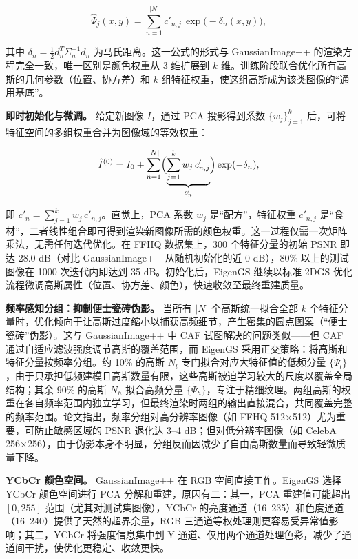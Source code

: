 \begin{equation}
\hat{\Psi}_j(x, y) = \sum_{n=1}^{|N|} c'_{n,j} \, \exp\!\bigl(-\delta_n(x, y)\bigr),
\end{equation}

其中 $\delta_n = \tfrac{1}{2} d_n^T \Sigma_n^{-1} d_n$ 为马氏距离。这一公式的形式与 GaussianImage++ 的渲染方程完全一致，唯一区别是颜色权重从 3 维扩展到 $k$ 维。训练阶段联合优化所有高斯的几何参数（位置、协方差）和 $k$ 组特征权重，使这组高斯成为该类图像的``通用基底''。

\textbf{即时初始化与微调。} 给定新图像 $I$，通过 PCA 投影得到系数 $\{w_j\}_{j=1}^k$ 后，可将特征空间的多组权重合并为图像域的等效权重：

\begin{equation}
\hat{I}^{(0)} = I_0 + \sum_{n=1}^{|N|} \Bigl(\underbrace{\sum_{j=1}^k w_j \, c'_{n,j}}_{c'_n}\Bigr) \exp(-\delta_n),
\end{equation}

即 $c'_n = \sum_{j=1}^k w_j \, c'_{n,j}$。直觉上，PCA 系数 $w_j$ 是``配方''，特征权重 $c'_{n,j}$ 是``食材''，二者线性组合即可得到渲染新图像所需的颜色权重。这一过程仅需一次矩阵乘法，无需任何迭代优化。在 FFHQ 数据集上，300 个特征分量的初始 PSNR 即达 28.0 dB（对比 GaussianImage++ 从随机初始化的近 0 dB），80\% 以上的测试图像在 1000 次迭代内即达到 35 dB。初始化后，EigenGS 继续以标准 2DGS 优化流程微调高斯属性（位置、协方差、颜色），快速收敛至最终重建质量。

\textbf{频率感知分组：抑制便士瓷砖伪影。} 当所有 $|N|$ 个高斯统一拟合全部 $k$ 个特征分量时，优化倾向于让高斯过度缩小以捕获高频细节，产生密集的圆点图案（``便士瓷砖''伪影）。这与 GaussianImage++ 中 CAF 试图解决的问题类似——但 CAF 通过自适应滤波强度调节高斯的覆盖范围，而 EigenGS 采用正交策略：将高斯和特征分量按频率分组。约 10\% 的高斯 $N_l$ 专门拟合对应大特征值的低频分量 $\{\tilde{\Psi}_l\}$，由于只承担低频建模且高斯数量有限，这些高斯被迫学习较大的尺度以覆盖全局结构；其余 90\% 的高斯 $N_h$ 拟合高频分量 $\{\tilde{\Psi}_h\}$，专注于精细纹理。两组高斯的权重在各自频率范围内独立学习，但最终渲染时两组的输出直接混合，共同覆盖完整的频率范围。论文指出，频率分组对高分辨率图像（如 FFHQ 512$\times$512）尤为重要，可防止敏感区域的 PSNR 退化达 3--4 dB；但对低分辨率图像（如 CelebA 256$\times$256），由于伪影本身不明显，分组反而因减少了自由高斯数量而导致轻微质量下降。

\textbf{YCbCr 颜色空间。} GaussianImage++ 在 RGB 空间直接工作。EigenGS 选择 YCbCr 颜色空间进行 PCA 分解和重建，原因有二：其一，PCA 重建值可能超出 $[0, 255]$ 范围（尤其对测试集图像），YCbCr 的亮度通道（16--235）和色度通道（16--240）提供了天然的超界余量，RGB 三通道等权处理则更容易受异常值影响；其二，YCbCr 将强度信息集中到 Y 通道、仅用两个通道处理色彩，减少了通道间干扰，使优化更稳定、收敛更快。

